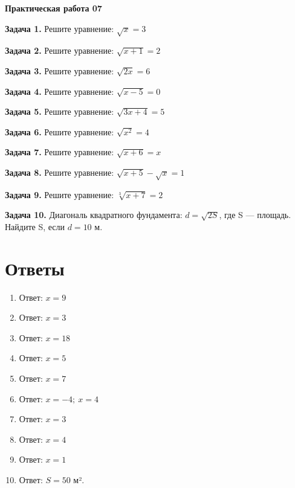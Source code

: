 \documentclass{umk-matematika}
\begin{document}
\begin{center}
{\Large\bfseries Практическая работа 07}
\end{center}
\vspace{0.5cm}

\textbf{Задача 1.} Решите уравнение: $\sqrt{x} = 3$\par\vspace{10pt}
\textbf{Задача 2.} Решите уравнение: $\sqrt{x + 1} = 2$\par\vspace{10pt}
\textbf{Задача 3.} Решите уравнение: $\sqrt{2x} = 6$\par\vspace{10pt}
\textbf{Задача 4.} Решите уравнение: $\sqrt{x - 5} = 0$\par\vspace{10pt}
\textbf{Задача 5.} Решите уравнение: $\sqrt{3x + 4} = 5$\par\vspace{10pt}
\textbf{Задача 6.} Решите уравнение: $\sqrt{x^2} = 4$\par\vspace{10pt}
\textbf{Задача 7.} Решите уравнение: $\sqrt{x + 6} = x$\par\vspace{10pt}
\textbf{Задача 8.} Решите уравнение: $\sqrt{x + 5} - \sqrt{x} = 1$\par\vspace{10pt}
\textbf{Задача 9.} Решите уравнение: $\sqrt[3]{x + 7} = 2$\par\vspace{10pt}
\textbf{Задача 10.} Диагональ квадратного фундамента: $d = \sqrt{2S}$, где S — площадь. Найдите S, если $d = 10$ м.\par\vspace{10pt}
\newpage
\section*{Ответы}

\begin{enumerate}
  \item Ответ: $x = 9$
  \item Ответ: $x = 3$
  \item Ответ: $x = 18$
  \item Ответ: $x = 5$
  \item Ответ: $x = 7$
  \item Ответ: $x = -4;\ x = 4$
  \item Ответ: $x = 3$
  \item Ответ: $x = 4$
  \item Ответ: $x = 1$
  \item Ответ: $S = 50$ м².
\end{enumerate}
\end{document}
